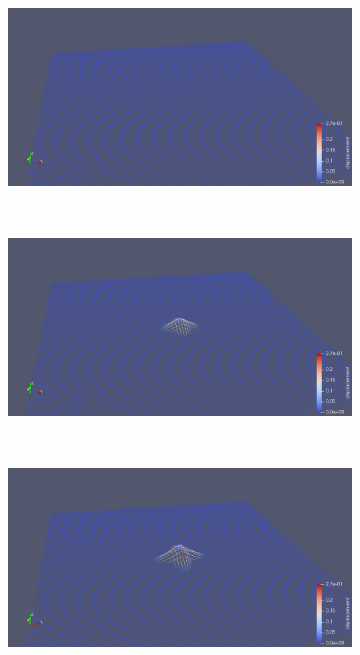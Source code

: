 \begin{figure}[H]
    \begin{subfigure}[t]{0.5\textwidth}
        \centering
        \includegraphics[width=\textwidth]{img/fiber/density_1_radius_1_amplitude_0.1/1.png}
    \end{subfigure}%
    ~
    \begin{subfigure}[t]{0.5\textwidth}
        \centering
        \includegraphics[width=\textwidth]{img/fiber/density_1_radius_1_amplitude_0.1/2.png}
    \end{subfigure}
    ~
    \begin{subfigure}[t]{0.5\textwidth}
        \centering
        \includegraphics[width=\textwidth]{img/fiber/density_1_radius_1_amplitude_0.1/3.png}

\end{subfigure}
\end{figure}
